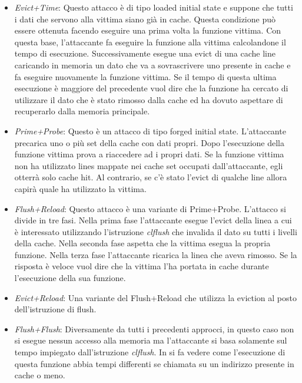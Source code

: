			\begin{itemize}
				\item \emph{Evict+Time}\cite{osvik2006cache}: Questo attacco è di tipo loaded initial state e suppone che tutti i dati che servono alla vittima siano già in cache. Questa condizione può essere ottenuta facendo eseguire una prima volta la funzione vittima. Con questa base, l'attaccante fa eseguire la funzione alla vittima calcolandone il tempo di esecuzione. Successivamente esegue una evict di una cache line caricando in memoria un dato che va a sovrascrivere uno presente in cache e fa eseguire nuovamente la funzione vittima. Se il tempo di questa ultima esecuzione è maggiore del precedente vuol dire che la funzione ha cercato di utilizzare il dato che è stato rimosso dalla cache ed ha dovuto aspettare di recuperarlo dalla memoria principale.
				\item \emph{Prime+Probe}\cite{osvik2006cache}: Questo è un attacco di tipo forged initial state. L'attaccante precarica uno o più set della cache con dati propri. Dopo l'esecuzione della funzione vittima prova a riaccedere ad i propri dati. Se la funzione vittima non ha utilizzato lines mappate nei cache set occupati dall'attaccante, egli otterrà solo cache hit. Al contrario, se c'è stato l'evict di qualche line allora capirà quale ha utilizzato la vittima.
				\item \emph{Flush+Reload}\cite{yarom2014flush+}: Questo attacco è una variante di Prime+Probe. L'attacco si divide in tre fasi. Nella prima fase l'attaccante esegue l'evict della linea a cui è interessato utilizzando l'istruzione \emph{clflush} che invalida il dato su tutti i livelli della cache. Nella seconda fase aspetta che la vittima esegua la propria funzione. Nella terza fase l'attaccante ricarica la linea che aveva rimosso. Se la risposta è veloce vuol dire che la vittima l'ha portata in cache durante l'esecuzione della sua funzione.
				\item \emph{Evict+Reload}\cite{gruss2015cache}: Una variante del Flush+Reload che utilizza la eviction al posto dell'istruzione di flush.
				\item \emph{Flush+Flush}\cite{gruss2016flush+}: Diversamente da tutti i precedenti approcci, in questo caso non si esegue nessun accesso alla memoria ma l'attaccante si basa solamente sul tempo impiegato dall'istruzione \emph{clflush}. In \cite{lipp2016armageddon} si fa vedere come l'esecuzione di questa funzione abbia tempi differenti se chiamata su un indirizzo presente in cache o meno.  
			\end{itemize}
		
